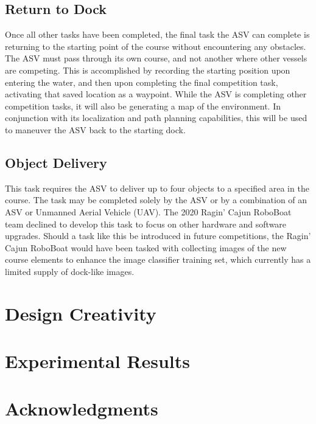 \documentclass[letterpaper, 10 pt, conference]{ieeeconf}
\begin{document}
\subsection{Return to Dock}
\label{ReturnToDock}
Once all other tasks have been completed, the final task the ASV can complete is returning to the starting point of the course without encountering any obstacles. The ASV must pass through its own course, and not another where other vessels are competing. This is accomplished by recording the starting position upon entering the water, and then upon completing the final competition task, activating that saved location as a waypoint. While the ASV is completing other competition tasks, it will also be generating a map of the environment. In conjunction with its localization and path planning capabilities, this will be used to maneuver the ASV back to the starting dock.

\subsection{Object Delivery}
\label{ObjectDelivery}
This task requires the ASV to deliver up to four objects to a specified area in the course. The task may be completed solely by the ASV or by a combination of an ASV or Unmanned Aerial Vehicle (UAV). The 2020 Ragin' Cajun RoboBoat team declined to develop this task to focus on other hardware and software upgrades. Should a task like this be introduced in future competitions, the Ragin' Cajun RoboBoat would have been tasked with collecting images of the new course elements to enhance the image classifier training set, which currently has a limited supply of dock-like images.

\section{Design Creativity}
\section{Experimental Results}
\section{Acknowledgments}
\begin{appendix}
\end{appendix}
\end{document}
